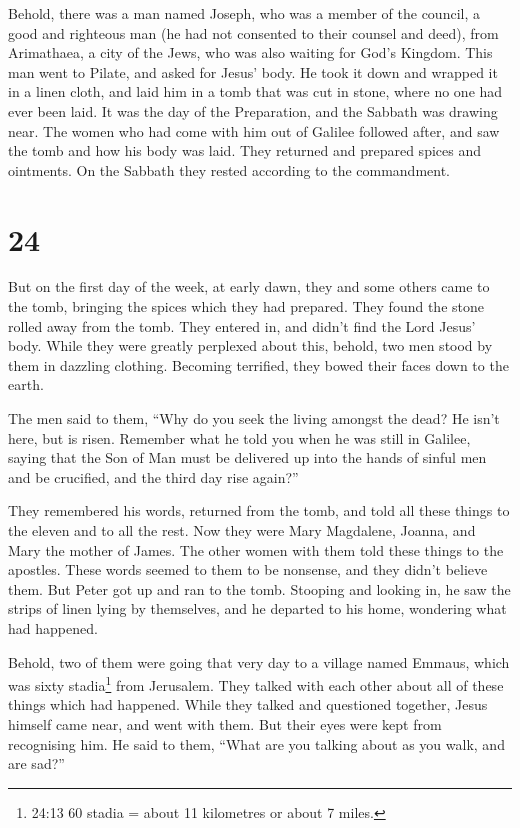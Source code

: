  Behold, there was a man named Joseph, who was a member of
the council, a good and righteous man  (he had not
consented to their counsel and deed), from Arimathaea, a city of the
Jews, who was also waiting for God's Kingdom.  This man
went to Pilate, and asked for Jesus' body.  He took it down
and wrapped it in a linen cloth, and laid him in a tomb that was cut in
stone, where no one had ever been laid.  It was the day of
the Preparation, and the Sabbath was drawing near.  The
women who had come with him out of Galilee followed after, and saw the
tomb and how his body was laid.  They returned and prepared
spices and ointments. On the Sabbath they rested according to the
commandment.

\hypertarget{section-23}{%
\section{24}\label{section-23}}

 But on the first day of the week, at early dawn, they and
some others came to the tomb, bringing the spices which they had
prepared.  They found the stone rolled away from the tomb.
 They entered in, and didn't find the Lord Jesus' body.
 While they were greatly perplexed about this, behold, two
men stood by them in dazzling clothing.  Becoming terrified,
they bowed their faces down to the earth.

The men said to them, ``Why do you seek the living amongst the dead?
 He isn't here, but is risen. Remember what he told you when
he was still in Galilee,  saying that the Son of Man must be
delivered up into the hands of sinful men and be crucified, and the
third day rise again?''

 They remembered his words,  returned from the
tomb, and told all these things to the eleven and to all the rest.
 Now they were Mary Magdalene, Joanna, and Mary the mother
of James. The other women with them told these things to the apostles.
 These words seemed to them to be nonsense, and they didn't
believe them.  But Peter got up and ran to the tomb.
Stooping and looking in, he saw the strips of linen lying by themselves,
and he departed to his home, wondering what had happened.

 Behold, two of them were going that very day to a village
named Emmaus, which was sixty stadia\footnote{24:13 60 stadia = about 11
  kilometres or about 7 miles.} from Jerusalem.  They
talked with each other about all of these things which had happened.
 While they talked and questioned together, Jesus himself
came near, and went with them.  But their eyes were kept
from recognising him.  He said to them, ``What are you
talking about as you walk, and are sad?''

